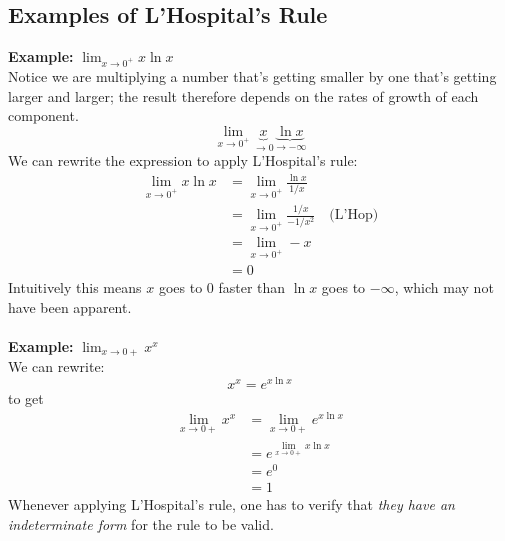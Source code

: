 \documentclass{report}
\begin{document}
\subsection{Examples of L'Hospital's Rule} %
\textbf{Example: }$\lim_{x\to0^+}x\ln x$\\
Notice we are multiplying a number that's getting smaller by one that's getting larger and 
larger; the result therefore depends on the rates of growth of each component.
\begin{equation*}
\lim_{x\to0^+}\underbrace{x}_{\to0}\underbrace{\ln x}_{\to-\infty}
\end{equation*}
We can rewrite the expression to apply L'Hospital's rule:
\begin{align*}
\lim_{x\to0^+}x\ln x&=\lim_{x\to0^+}\frac{\ln x}{1/x}\\
&=\lim_{x\to0^+}\frac{1/x}{-1/x^2}\quad\text{(L'Hop)}\\
&=\lim_{x\to0^+}-x\\
&=0
\end{align*}
Intuitively this means $x$ goes to 0 faster than $\ln x$ goes to $-\infty$, which may not have been apparent.\\
\vspace{1mm}\\
\textbf{Example: }$\lim_{x\to0+}x^x$\\
We can rewrite:
\begin{equation*}
x^x=e^{x\ln x}
\end{equation*}
to get
\begin{align*}
\lim_{x\to0+}x^x&=\lim_{x\to0+}e^{x\ln x}\\
&=e^{\lim_{x\to0+}x\ln x}\\
&=e^0\\
&=1
\end{align*}
Whenever applying L'Hospital's rule, one has to verify that \textit{they have an indeterminate form} 
for the rule to be valid.
\newpage
\end{document}
